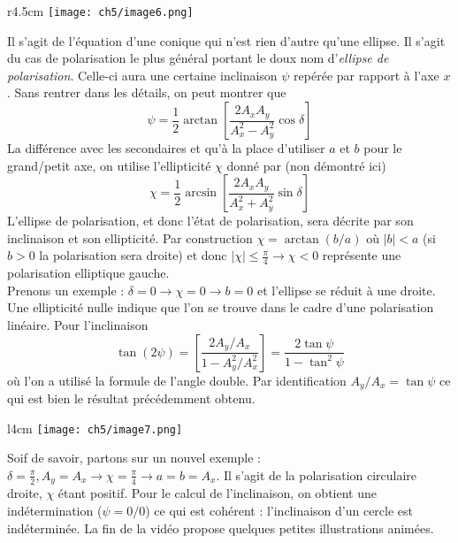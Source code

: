 		\begin{wrapfigure}[2]{r}{4.5cm}
	\vspace{-12mm}
	\texttt{[image: ch5/image6.png]}
	\end{wrapfigure}
	Il s'agit de l'équation d'une conique qui n'est rien d'autre qu'une ellipse. Il s'agit du cas de 
	polarisation le plus général portant le doux nom d'\textit{ellipse de polarisation}. Celle-ci aura 
	une certaine inclinaison $\psi$ repérée par rapport à l'axe $x$. Sans rentrer dans les détails, on 
	peut montrer que
	\begin{equation}
	\psi = \frac{1}{2}\arctan\left[\dfrac{2A_xA_y}{A_x^2-A_y^2}\cos\delta\right]
	\end{equation}
	La différence avec les secondaires et qu'à la place d'utiliser $a$ et $b$ pour le grand/petit axe, 
	on utilise l'ellipticité $\chi$ donné par (non démontré ici)
	\begin{equation}
	\chi = \frac{1}{2}\arcsin\left[\dfrac{2A_xA_y}{A_x^2+A_y^2}\sin\delta\right]
	\end{equation}
	L’ellipse de polarisation, et donc l'état de polarisation, sera décrite par son inclinaison et 
	son ellipticité. Par construction $\chi=\arctan(b/a)$ où $|b|<a$ (si $b>0$ la polarisation sera 
	droite) et donc $|\chi| \leq  \frac{\pi}{4} \rightarrow \chi <0$ représente une polarisation 
	elliptique gauche.\\
	
	Prenons un exemple : $\delta = 0\rightarrow \chi = 0\rightarrow b = 0$ et l'ellipse se réduit à 
	une droite. Une ellipticité nulle indique que l'on se trouve dans le cadre d'une polarisation 
	linéaire. Pour l'inclinaison 
	\begin{equation}
	\tan(2\psi) = \left[\frac{2A_y/A_x}{1-A_y^2/A_x^2}\right] = \dfrac{2\tan\psi}{1-\tan^2\psi}
	\end{equation}
	où l'on a utilisé la formule de l'angle double. Par identification $A_y/A_x = \tan\psi$ ce qui 
	est bien le résultat précédemment obtenu.\\
	
	\begin{wrapfigure}[6]{l}{4cm}
	\vspace{-9mm}
	\texttt{[image: ch5/image7.png]}
	\end{wrapfigure}
	Soif de savoir, partons sur un nouvel exemple : $\delta = \frac{\pi}{2}, A_y=A_x \rightarrow 
	\chi = \frac{\pi}{4}\rightarrow a=b=A_x$. Il s'agit de la polarisation circulaire droite, 
	$\chi$ étant positif. Pour le calcul de l'inclinaison, on obtient une indétermination ($\psi = 0/0$)
	ce qui est cohérent : l'inclinaison d'un cercle est indéterminée. La fin de la vidéo propose quelques 
	petites illustrations animées.\\
	
